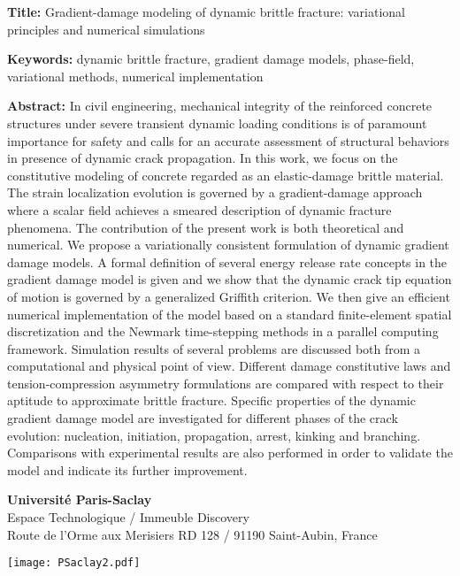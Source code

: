 \begin{flushleft}
\vspace{20pt}

\begin{mdframed}
\textbf{Title:} Gradient-damage modeling of dynamic brittle fracture: variational principles and numerical simulations

\textbf{Keywords:} dynamic brittle fracture, gradient damage models, phase-field, variational methods, numerical implementation

\textbf{Abstract:} In civil engineering, mechanical integrity of the reinforced concrete structures under severe transient dynamic loading conditions is of paramount importance for safety and calls for an accurate assessment of structural behaviors in presence of dynamic crack propagation. In this work, we focus on the constitutive modeling of concrete regarded as an elastic-damage brittle material. The strain localization evolution is governed by a gradient-damage approach where a scalar field achieves a smeared description of dynamic fracture phenomena. The contribution of the present work is both theoretical and numerical. We propose a variationally consistent formulation of dynamic gradient damage models. A formal definition of several energy release rate concepts in the gradient damage model is given and we show that the dynamic crack tip equation of motion is governed by a generalized Griffith criterion. We then give an efficient numerical implementation of the model based on a standard finite-element spatial discretization and the Newmark time-stepping methods in a parallel computing framework. Simulation results of several problems are discussed both from a computational and physical point of view. Different damage constitutive laws and tension-compression asymmetry formulations are compared with respect to their aptitude to approximate brittle fracture. Specific properties of the dynamic gradient damage model are investigated for different phases of the crack evolution: nucleation, initiation, propagation, arrest, kinking and branching. Comparisons with experimental results are also performed in order to validate the model and indicate its further improvement.
\end{mdframed}
\end{flushleft}

\vfill

\begin{minipage}[b]{0.6\textwidth}
\small
\color{color02}
\textbf{Université Paris-Saclay} \\
Espace Technologique / Immeuble Discovery  \\
Route de l'Orme aux Merisiers RD 128 / 91190 Saint-Aubin, France
\end{minipage}
\hfill
\begin{minipage}[b]{0.35\textwidth}
\hfill
\texttt{[image: PSaclay2.pdf]}
\end{minipage}